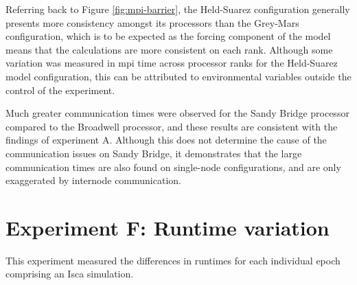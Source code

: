 \documentclass[a4paper,11pt]{report}
\begin{document}
\par
Referring back to Figure \ref{fig:mpi-barrier}, the Held-Suarez configuration generally presents more consistency amongst its processors than the Grey-Mars configuration, which is to be expected as the forcing component of the model means that the calculations are more consistent on each rank. Although some variation was measured in \gls{mpi} time across processor ranks for the Held-Suarez model configuration, this can be attributed to environmental variables outside the control of the experiment. 
\par
Much greater communication times were observed for the Sandy Bridge processor compared to the Broadwell processor, and these results are consistent with the findings of experiment A. Although this does not determine the cause of the communication issues on Sandy Bridge, it demonstrates that the large communication times are also found on single-node configurations, and are only exaggerated by internode communication.
\par


\section{Experiment F: Runtime variation}
This experiment measured the differences in runtimes for each individual epoch comprising an Isca simulation.
\end{document}
